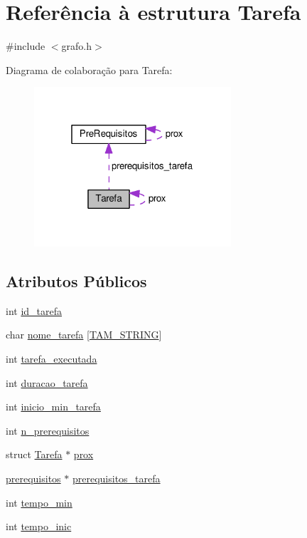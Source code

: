 \hypertarget{structTarefa}{\section{Referência à estrutura Tarefa}
\label{structTarefa}
}


{\ttfamily \#include $<$grafo.\-h$>$}



Diagrama de colaboração para Tarefa\-:
\nopagebreak
\begin{figure}[H]
\begin{center}
\leavevmode
\includegraphics[width=208pt]{structTarefa__coll__graph}
\end{center}
\end{figure}
\subsection*{Atributos Públicos}
\begin{DoxyCompactItemize}
\item 
int \hyperlink{structTarefa_a1509b75b75f758e2d0502df4162366f2}{id\-\_\-tarefa}
\item 
char \hyperlink{structTarefa_a43c0db59f4e6a3031ef2a5951ad8910f}{nome\-\_\-tarefa} \mbox{[}\hyperlink{grafo_8h_a5d28dfdab86222715d699097e8cd092f}{T\-A\-M\-\_\-\-S\-T\-R\-I\-N\-G}\mbox{]}
\item 
int \hyperlink{structTarefa_a86ef331b855e3f91eec492a00171cc9c}{tarefa\-\_\-executada}
\item 
int \hyperlink{structTarefa_a7962bef326f487f4ffa7dc0f04153729}{duracao\-\_\-tarefa}
\item 
int \hyperlink{structTarefa_a7d09c30d0162c55a0aab1ad71716fae6}{inicio\-\_\-min\-\_\-tarefa}
\item 
int \hyperlink{structTarefa_a9f6369cef91f4b9d544d9e1be0bc705f}{n\-\_\-prerequisitos}
\item 
struct \hyperlink{structTarefa}{Tarefa} $\ast$ \hyperlink{structTarefa_a1b0bbf147698174596c486d12afa254e}{prox}
\item 
\hyperlink{grafo_8h_a8d260ebf15bfe9b5f9366d2245289e15}{prerequisitos} $\ast$ \hyperlink{structTarefa_abdbaac144f089e939832a4d6cbf0759a}{prerequisitos\-\_\-tarefa}
\item 
int \hyperlink{structTarefa_a4fd1b4c3fd98a3fb754116f6cc80c906}{tempo\-\_\-min}
\item 
int \hyperlink{structTarefa_a202a3c8fbee0bf74488fa057587f13df}{tempo\-\_\-inic}
\end{DoxyCompactItemize}



